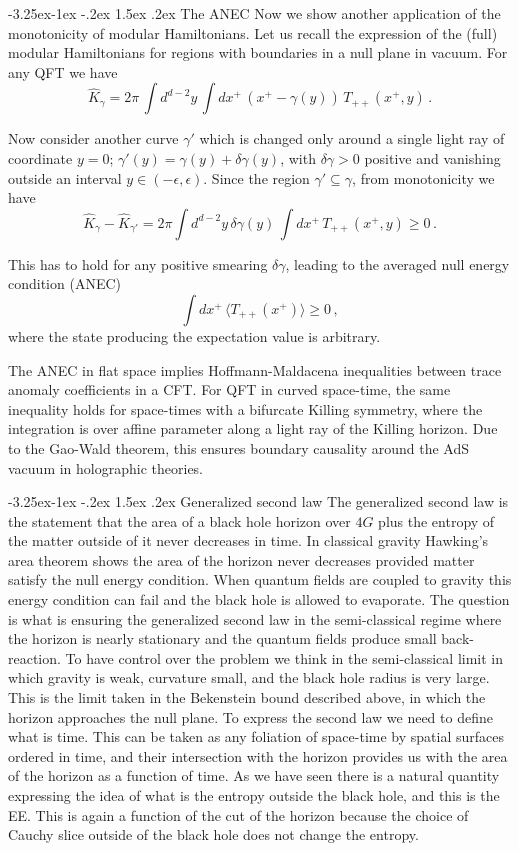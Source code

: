 \documentclass[11pt]{article}
\makeatletter
\renewcommand\subsection{\@startsection{subsection}{2}{\z@}%
                                   {-3.25ex\@plus -1ex \@minus -.2ex}%
                                     {1.5ex \@plus .2ex}%
                                     {\normalfont\bfseries}}
\numberwithin{equation}{section}
\newcommand{\be}{\begin{equation}}
\newcommand{\ee}{\end{equation}}
\makeatother
\begin{document}
\subsection{The ANEC}
Now we show another application of the monotonicity of modular Hamiltonians. Let us recall the expression of the (full) modular Hamiltonians for regions with boundaries in a null plane in vacuum. For any QFT we have
\be
\hat{K}_\gamma=2\pi \, \int d^{d-2}y\, \int dx^+\, (x^+-\gamma(y)) \, T_{++}(x^+,y)\,. 
\ee

Now consider another curve $\gamma'$ which is changed only around a single light ray of coordinate $y=0$; $\gamma'(y)=\gamma(y)+\delta\gamma(y)$, with $\delta \gamma>0$ positive and vanishing outside an interval $y\in (-\epsilon,\epsilon)$. Since the region $\gamma'\subseteq \gamma$, from monotonicity we have
\be
\hat{K}_\gamma-\hat{K}_{\gamma'}=2 \pi\int d^{d-2}y\, \delta \gamma(y) \,\int dx^+\,  T_{++}(x^+,y)\ge 0\,.
\ee   

This has to hold for any positive smearing $\delta\gamma$, leading to the averaged null energy condition (ANEC)
\be
\int dx^+\,  \langle T_{++}(x^+)\rangle\ge 0\,,
\ee
where the state producing the expectation value is arbitrary. 

The ANEC in flat space implies Hoffmann-Maldacena inequalities between trace anomaly coefficients in a CFT. For QFT in curved space-time, the same inequality holds for space-times with a bifurcate Killing symmetry, where the integration is over affine parameter along a light ray of the Killing horizon. Due to the Gao-Wald theorem, this ensures boundary causality around the AdS vacuum in holographic theories.  

\subsection{Generalized second law}
The generalized second law is the statement that the area of a black hole horizon over $4G$ plus the entropy of the matter outside of it never decreases in time. In classical gravity  Hawking's area theorem shows the area of the horizon never decreases provided matter satisfy the null energy condition. When quantum fields are coupled to gravity this energy condition can fail and the black hole is allowed to evaporate. The question is what is ensuring the generalized second law in the semi-classical regime where the horizon is nearly stationary and the quantum fields produce small back-reaction.      
To have control over the problem we think in the semi-classical limit in which gravity is weak, curvature small, and the black hole radius is very large. This is the limit taken in the Bekenstein bound described above, in which the horizon approaches the null plane. To express the second law we need to define what is time. This can be taken as any foliation of space-time by spatial surfaces ordered in time, and their intersection with the horizon provides us with the area of the horizon as a function of time.  
As we have seen there is a natural quantity expressing the idea of what is the entropy outside the black hole, and this is the EE. This is again a function of the cut of the horizon because the choice of Cauchy slice outside of the black hole does not change the entropy.      
\end{document}
